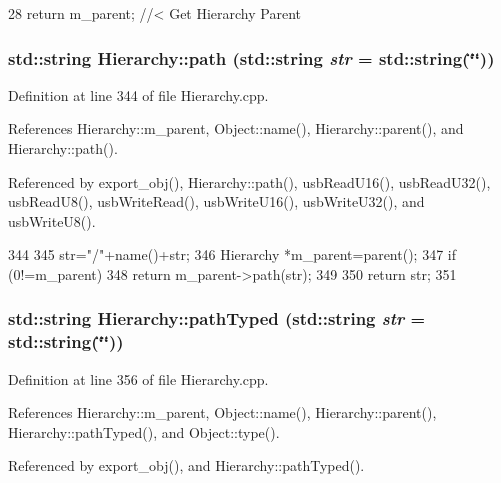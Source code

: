 \begin{DoxyCode}
28 { return m_parent; }  //< Get Hierarchy Parent
\end{DoxyCode}
\hypertarget{classHierarchy_aa7990fa7caf132d83e361ce033c6c65a}{
\subsubsection[{path}]{\setlength{\rightskip}{0pt plus 5cm}std::string Hierarchy::path (std::string {\em str} = {\ttfamily std::string(\char`\"{}\char`\"{})})}}
\label{classHierarchy_aa7990fa7caf132d83e361ce033c6c65a}


Definition at line 344 of file Hierarchy.cpp.

References Hierarchy::m\_\-parent, Object::name(), Hierarchy::parent(), and Hierarchy::path().

Referenced by export\_\-obj(), Hierarchy::path(), usbReadU16(), usbReadU32(), usbReadU8(), usbWriteRead(), usbWriteU16(), usbWriteU32(), and usbWriteU8().


\begin{DoxyCode}
344                                       {
345   str="/"+name()+str;
346   Hierarchy *m_parent=parent();
347   if (0!=m_parent){
348     return m_parent->path(str);
349   }
350   return str;
351 }
\end{DoxyCode}
\hypertarget{classHierarchy_a1efd56cd164d328d2002e53a10a19b8c}{
\subsubsection[{pathTyped}]{\setlength{\rightskip}{0pt plus 5cm}std::string Hierarchy::pathTyped (std::string {\em str} = {\ttfamily std::string(\char`\"{}\char`\"{})})}}
\label{classHierarchy_a1efd56cd164d328d2002e53a10a19b8c}


Definition at line 356 of file Hierarchy.cpp.

References Hierarchy::m\_\-parent, Object::name(), Hierarchy::parent(), Hierarchy::pathTyped(), and Object::type().

Referenced by export\_\-obj(), and Hierarchy::pathTyped().


